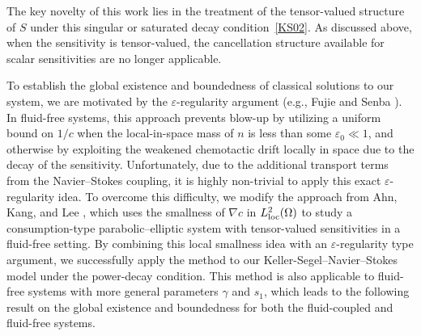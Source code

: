 \documentclass{amsart}
\numberwithin{equation}{section}
\begin{document}
The key novelty of this work lies in the treatment of the tensor-valued structure of $S$ under this singular or saturated decay condition~\eqref{KS02}. As discussed above, when the sensitivity is tensor-valued, the cancellation structure available for scalar sensitivities are no longer applicable.

To establish the global existence and boundedness of classical solutions to our system, we are motivated by the $\varepsilon$-regularity argument (e.g., Fujie and Senba \cite{FujieSenba_DCDSB_2016}). In fluid-free systems, this approach prevents blow-up by utilizing a uniform bound on $1/c$ when the local-in-space mass of $n$ is less than some $\varepsilon_{0}\ll1$, and otherwise by exploiting the weakened chemotactic drift locally in space due to the decay of the sensitivity. Unfortunately, due to the additional transport terms from the Navier--Stokes coupling, it is highly non-trivial to apply this exact $\varepsilon$-regularity idea. 
To overcome this difficulty, we modify the approach from Ahn, Kang, and Lee \cite{Ahn_Kang_Lee_2023}, which uses the  smallness of $\nabla c$ in $L^2_{\rm loc}(\Omega)$ to study a consumption-type parabolic--elliptic  system with tensor-valued sensitivities in a fluid-free setting. By combining this local smallness idea with an $\varepsilon$-regularity type argument, we successfully apply the method to our Keller-Segel--Navier--Stokes model under the power-decay condition. This method is also applicable to fluid-free systems with more general parameters $\gamma$ and $s_{1}$, which leads to the following result on the global existence and boundedness for both the fluid-coupled and fluid-free systems.
\end{document}
